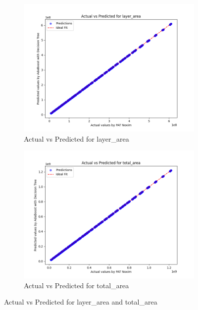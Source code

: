 \documentclass[conference]{IEEEtran}
\begin{document}
\begin{figure}[htbp]
    \begin{subfigure}{0.24\textwidth}
        \centering
        \includegraphics[width=\linewidth]{actual_vs_predicted_layer_area.png}
        \caption{Actual vs Predicted for layer\_area}
        \label{fig:actual_vs_predicted_layer_area}
    \end{subfigure}
    \hfill
    \begin{subfigure}{0.24\textwidth}
        \centering
        \includegraphics[width=\linewidth]{actual_vs_predicted_total_area.png}
        \caption{Actual vs Predicted for total\_area}
        \label{fig:actual_vs_predicted_total_area}
    \end{subfigure}

    \caption{Actual vs Predicted for layer\_area and total\_area}
    \label{fig:side_by_side_graphs_layer_area_total_area}
\end{figure}
\end{document}
